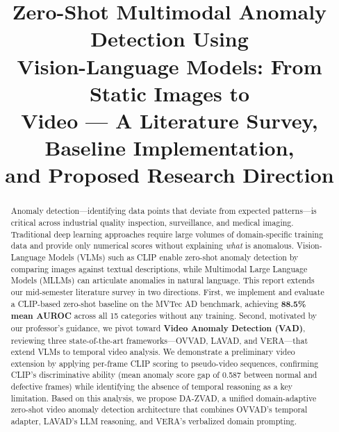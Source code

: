 \documentclass[conference]{IEEEtran}
\begin{document}
\title{Zero-Shot Multimodal Anomaly Detection Using\\Vision-Language Models: From Static Images to\\Video — A Literature Survey, Baseline Implementation,\\and Proposed Research Direction}

\author{
\and
{}
}

\maketitle

\begin{abstract}
Anomaly detection---identifying data points that deviate from expected patterns---is critical across industrial quality inspection, surveillance, and medical imaging. Traditional deep learning approaches require large volumes of domain-specific training data and provide only numerical scores without explaining \textit{what} is anomalous. Vision-Language Models (VLMs) such as CLIP enable zero-shot anomaly detection by comparing images against textual descriptions, while Multimodal Large Language Models (MLLMs) can articulate anomalies in natural language. This report extends our mid-semester literature survey in two directions. First, we implement and evaluate a CLIP-based zero-shot baseline on the MVTec AD benchmark, achieving \textbf{88.5\% mean AUROC} across all 15 categories without any training. Second, motivated by our professor's guidance, we pivot toward \textbf{Video Anomaly Detection (VAD)}, reviewing three state-of-the-art frameworks---OVVAD, LAVAD, and VERA---that extend VLMs to temporal video analysis. We demonstrate a preliminary video extension by applying per-frame CLIP scoring to pseudo-video sequences, confirming CLIP's discriminative ability (mean anomaly score gap of 0.587 between normal and defective frames) while identifying the absence of temporal reasoning as a key limitation. Based on this analysis, we propose DA-ZVAD, a unified domain-adaptive zero-shot video anomaly detection architecture that combines OVVAD's temporal adapter, LAVAD's LLM reasoning, and VERA's verbalized domain prompting.
\end{abstract}
\end{document}
